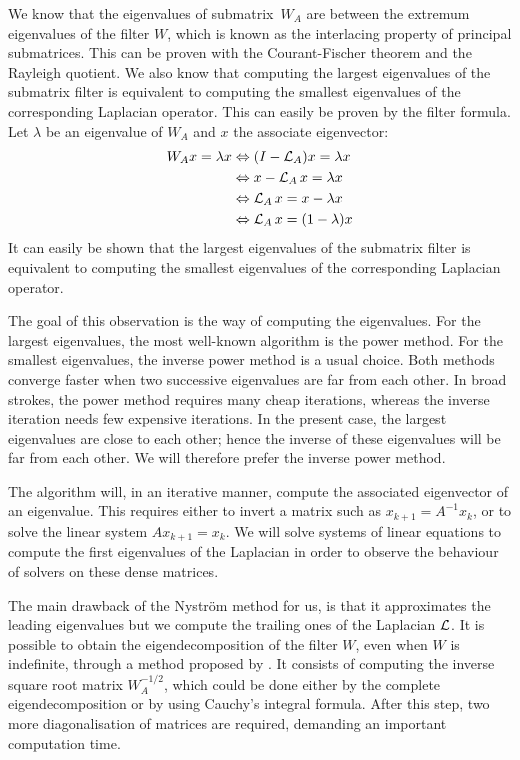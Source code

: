 \ifthesis
 We know that the eigenvalues of submatrix\ \(W_A\) are between the extremum eigenvalues of the filter \(W\), which is known as the interlacing property of principal submatrices.
 This can be proven with the Courant-Fischer theorem and the Rayleigh quotient.
 We also know that computing the largest eigenvalues of the submatrix filter is equivalent to computing the smallest eigenvalues of the corresponding Laplacian operator.
 This can easily be proven by the filter formula.
 Let \(\lambda\) be an eigenvalue of \(W_A\) and \(x\) the associate eigenvector:
 \begin{equation}
  \begin{split}
      W_A x = \lambda x & \Leftrightarrow (I - \operatorname{\mathcal{L}}_A)x = \lambda x \\
                      & \Leftrightarrow x - \operatorname{\mathcal{L}}_A x = \lambda x \\
                      & \Leftrightarrow \operatorname{\mathcal{L}}_A x = x - \lambda x \\
                      & \Leftrightarrow \operatorname{\mathcal{L}}_A x = (1 - \lambda) x
  \end{split}
 \end{equation}
\else
 It can easily be shown that the largest eigenvalues of the submatrix filter is equivalent to computing the smallest eigenvalues of the corresponding Laplacian operator.
\fi

The goal of this observation is the way of computing the eigenvalues.
For the largest eigenvalues, the most well-known algorithm is the power method.
For the smallest eigenvalues, the inverse power method is a usual choice.
Both methods converge faster when two successive eigenvalues are far from each other.
In broad strokes, the power method requires many cheap iterations, whereas the inverse iteration needs few expensive iterations.
In the present case, the largest eigenvalues are close to each other; hence the inverse of these eigenvalues will be far from each other.
We will therefore prefer the inverse power method.

The algorithm will, in an iterative manner, compute the associated eigenvector of an eigenvalue.
This requires either to invert a matrix such as \(x_{k+1} = A^{-1} x_k\), or to solve the linear system \(A x_{k+1} = x_k\).
We will solve systems of linear equations to compute the first eigenvalues of the Laplacian in order to observe the behaviour of solvers on these dense matrices.

The main drawback of the Nystr\"om method for us, is that it approximates the leading eigenvalues but we compute the trailing ones of the Laplacian \(\operatorname{\mathcal{L}}\)\ifthesis \cite{belongie_spectral_2002}\fi.
It is possible to obtain the eigendecomposition of the filter \(W\), even when \(W\) is indefinite, through a method proposed by \cite{fowlkes_spectral_2004}.
\ifthesis
 It consists of computing the inverse square root matrix \(W_A^{-1/2}\), which could be done either by the complete eigendecomposition or by using Cauchy's integral formula.
 After this step, two more diagonalisation of matrices are required, demanding an important computation time.
\fi

